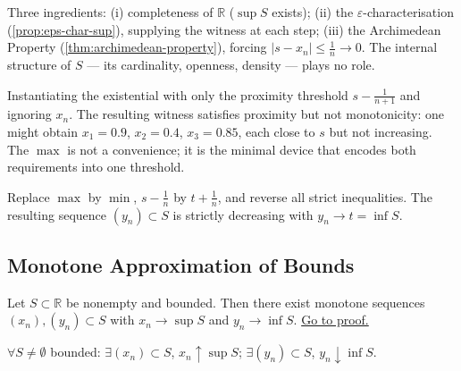 \begin{remark}
Three ingredients: (i) completeness of $\mathbb{R}$ ($\sup S$ exists);
(ii) the $\varepsilon$-characterisation (\cref{prop:eps-char-sup}), supplying
the witness at each step; (iii) the Archimedean Property
(\cref{thm:archimedean-property}), forcing $|s-x_n|\leq\tfrac{1}{n}\to 0$.
The internal structure of $S$ --- its cardinality, openness, density ---
plays no role.
\end{remark}

\begin{remark}
Instantiating the existential with only the proximity threshold
$s-\tfrac{1}{n+1}$ and ignoring $x_n$. The resulting witness satisfies
proximity but not monotonicity: one might obtain $x_1=0.9$, $x_2=0.4$,
$x_3=0.85$, each close to $s$ but not increasing. The $\max$ is not a
convenience; it is the minimal device that encodes both requirements into
one threshold.
\end{remark}

\begin{remark}
Replace $\max$ by $\min$, $s-\tfrac{1}{n}$ by $t+\tfrac{1}{n}$, and
reverse all strict inequalities. The resulting sequence $(y_n)\subset S$
is strictly decreasing with $y_n\to t=\inf S$.
\end{remark}

\subsection*{Monotone Approximation of Bounds}
\label{subsec:monotone-approx}

\begin{proposition}
\label{prop:monotone-approx-bounds}
Let $S\subset\mathbb{R}$ be nonempty and bounded. Then there exist
monotone sequences $(x_n),(y_n)\subset S$ with
$x_n\to\sup S$ and $y_n\to\inf S$.
\hyperref[prf:monotone-approx-bounds]{Go to proof.}
\end{proposition}

\begin{remark*}
\end{remark*}


\begin{remark}
$\forall S\neq\emptyset$ bounded:
$\exists(x_n)\subset S$, $x_n\uparrow\sup S$;\;
$\exists(y_n)\subset S$, $y_n\downarrow\inf S$.
\end{remark}

